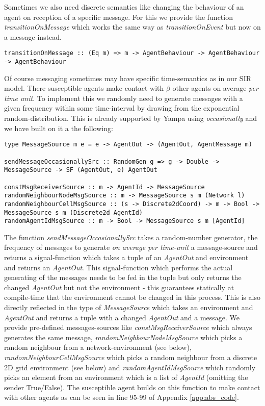 Sometimes we also need discrete semantics like changing the behaviour of an agent on reception of a specific message. For this we provide the function \textit{transitionOnMessage} which works the same way as \textit{transitionOnEvent} but now on a message instead.

\begin{verbatim}
transitionOnMessage :: (Eq m) => m -> AgentBehaviour -> AgentBehaviour -> AgentBehaviour
\end{verbatim}

Of course messaging sometimes may have specific time-semantics as in our SIR model. There susceptible agents make contact with $\beta$ other agents on average \textit{per time unit}. To implement this we randomly need to generate messages with a given frequency within some time-interval by drawing from the exponential random-distribution. This is already supported by Yampa using \textit{occasionally} and we have built on it a the following:

\begin{verbatim}
type MessageSource m e = e -> AgentOut -> (AgentOut, AgentMessage m)

sendMessageOccasionallySrc :: RandomGen g => g -> Double -> MessageSource -> SF (AgentOut, e) AgentOut

constMsgReceiverSource :: m -> AgentId -> MessageSource 
randomNeighbourNodeMsgSource :: m -> MessageSource s m (Network l)
randomNeighbourCellMsgSource :: (s -> Discrete2dCoord) -> m -> Bool -> MessageSource s m (Discrete2d AgentId)
randomAgentIdMsgSource :: m -> Bool -> MessageSource s m [AgentId]
\end{verbatim}

The function \textit{sendMessageOccasionallySrc} takes a random-number generator, the frequency of messages to generate \textit{on average per time-unit} a message-source and returns a signal-function which takes a tuple of an \textit{AgentOut} and environment and returns an \textit{AgentOut}. This signal-function which performs the actual generating of the messages needs to be fed in the tuple but only returns the changed \textit{AgentOut} but not the environment - this guarantees statically at compile-time that the environment cannot be changed in this process. This is also directly reflected in the type of \textit{MessageSource} which takes an environment and \textit{AgentOut} and returns a tuple with a changed \textit{AgentOut} and a message. We provide pre-defined messages-sources like \textit{constMsgReceiverSource} which always generates the same message, \textit{randomNeighbourNodeMsgSource} which picks a random neighbour from a network-environment (see below), \textit{randomNeighbourCellMsgSource} which picks a random neighbour from a discrete 2D grid environment (see below) and \textit{randomAgentIdMsgSource} which randomly picks an element from an environment which is a list of \textit{AgentId} (omitting the sender True/False). The susceptible agent builds on this function to make contact with other agents as can be seen in line 95-99 of Appendix \ref{app:abs_code}.

